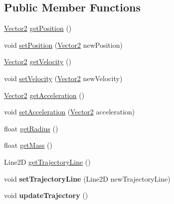 \subsection*{Public Member Functions}
\begin{DoxyCompactItemize}
\item 
\hyperlink{classairhockeyjava_1_1util_1_1_vector2}{Vector2} \hyperlink{classairhockeyjava_1_1physical_1_1_moving_item_af805131d435d34b7138d25c82ff9e628}{get\+Position} ()
\item 
void \hyperlink{classairhockeyjava_1_1physical_1_1_moving_item_a4460a508e5261c7ed4848e473d09aaa3}{set\+Position} (\hyperlink{classairhockeyjava_1_1util_1_1_vector2}{Vector2} new\+Position)
\item 
\hyperlink{classairhockeyjava_1_1util_1_1_vector2}{Vector2} \hyperlink{classairhockeyjava_1_1physical_1_1_moving_item_aa56a8bcd68fbf188fd7fc8032ac5745c}{get\+Velocity} ()
\item 
void \hyperlink{classairhockeyjava_1_1physical_1_1_moving_item_a789d737af60910f6207eb43873898d21}{set\+Velocity} (\hyperlink{classairhockeyjava_1_1util_1_1_vector2}{Vector2} new\+Velocity)
\item 
\hyperlink{classairhockeyjava_1_1util_1_1_vector2}{Vector2} \hyperlink{classairhockeyjava_1_1physical_1_1_moving_item_aa262a387678357ecce80bcd82a1e45f2}{get\+Acceleration} ()
\item 
void \hyperlink{classairhockeyjava_1_1physical_1_1_moving_item_a062365957f9fccda5013c92366408ac1}{set\+Acceleration} (\hyperlink{classairhockeyjava_1_1util_1_1_vector2}{Vector2} acceleration)
\item 
float \hyperlink{classairhockeyjava_1_1physical_1_1_moving_item_a14798e1160095c5b6f169e229758673c}{get\+Radius} ()
\item 
float \hyperlink{classairhockeyjava_1_1physical_1_1_moving_item_a82f6c73b6fdca83c0b35484c38d5a2ee}{get\+Mass} ()
\item 
Line2\+D \hyperlink{classairhockeyjava_1_1physical_1_1_moving_item_a33d1b5ba2507b560e474dee4ce5b6d34}{get\+Trajectory\+Line} ()
\item 
\hypertarget{classairhockeyjava_1_1physical_1_1_moving_item_a72a84c160a0b90311481438e59a2203f}{}void {\bfseries set\+Trajectory\+Line} (Line2\+D new\+Trajectory\+Line)\label{classairhockeyjava_1_1physical_1_1_moving_item_a72a84c160a0b90311481438e59a2203f}

\item 
\hypertarget{classairhockeyjava_1_1physical_1_1_moving_item_ab4bb5dbb34e09bfa9b7a2bdef0512074}{}void {\bfseries update\+Trajectory} ()\label{classairhockeyjava_1_1physical_1_1_moving_item_ab4bb5dbb34e09bfa9b7a2bdef0512074}


\end{DoxyCompactItemize}
